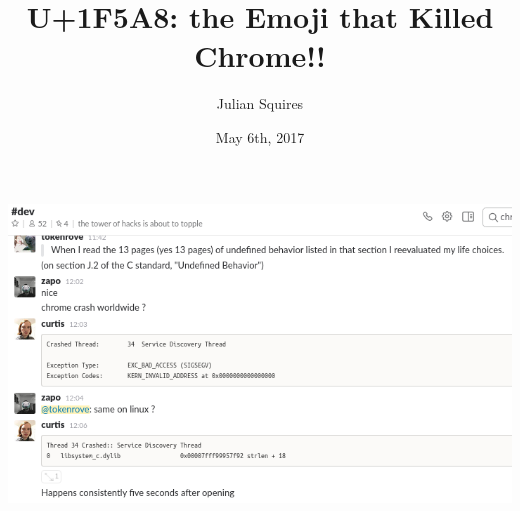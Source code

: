 \documentclass[aspectratio=169]{beamer}
\title{U+1F5A8: the Emoji that Killed Chrome!!}
\author{Julian Squires}
\date{May 6th, 2017}
\begin{document}
\begin{frame}
  \titlepage{}
\end{frame}

\begin{frame}
  \begin{center}
    \includegraphics[scale=0.5]{01-chrome-crash-worldwide}
  \end{center}
\end{frame}
\end{document}
